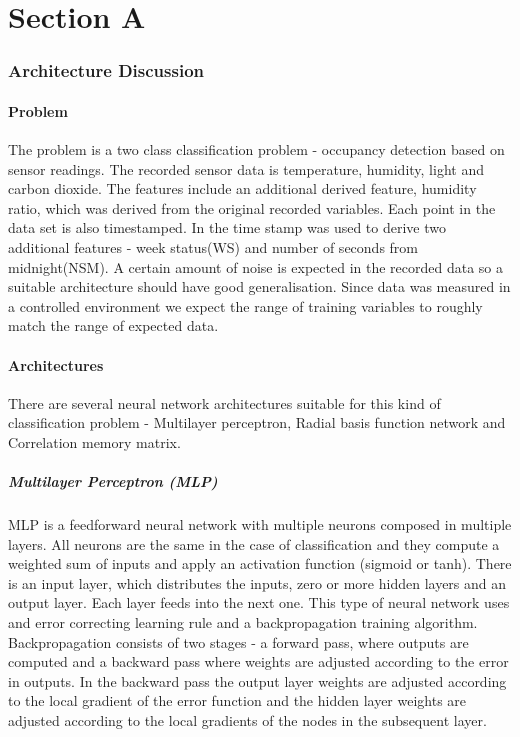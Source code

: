 \documentclass[a4paper, 11pt]{article}
\begin{document}
\noindent


\part*{Section A}
\section*{Architecture Discussion}

\subsection*{Problem}
The problem is a two class classification problem - occupancy detection based on sensor readings. The recorded sensor data is temperature, humidity, light and carbon dioxide. The features include an additional derived feature, humidity ratio, which was derived from the original recorded variables. Each point in the data set is also timestamped. In \cite{Candanedo2016} the time stamp was used to derive two additional features - week status(WS) and number of seconds from midnight(NSM).
A certain amount of noise is expected in the recorded data so a suitable architecture should have good generalisation. Since data was measured in a controlled environment we expect the range of training variables to roughly match the range of expected data.

\subsection*{Architectures}
There are several neural network architectures suitable for this kind of classification problem - Multilayer perceptron, Radial basis function network and Correlation memory matrix. 
\subsubsection*{Multilayer Perceptron (MLP)}
MLP is a feedforward neural network with multiple neurons composed in multiple layers. All neurons are the same in the case of classification and they compute a weighted sum of inputs and apply an activation function (sigmoid or tanh). There is an input layer, which distributes the inputs, zero or more hidden layers and an output layer. Each layer feeds into the next one. This type of neural network uses and error correcting learning rule and a backpropagation training algorithm. Backpropagation consists of two stages - a forward pass, where outputs are computed and a backward pass where weights are adjusted according to the error in outputs. In the backward pass the output layer weights are adjusted according to the local gradient of the error function and the hidden layer weights are adjusted according to the local gradients of the nodes in the subsequent layer. 
\end{document}
